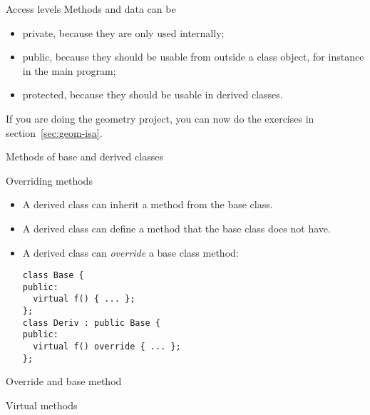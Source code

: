 \begin{block}{Access levels}
  \label{sl:private-etc}
  Methods and data can be
  \begin{itemize}
  \item private, because they are only used internally;
  \item public, because they should be usable from outside a class
    object, for instance in the main program;
  \item protected, because they should be usable in derived classes.
  \end{itemize}
\end{block}

\begin{exercise}
  If you are doing the geometry project, 
  you can now do the exercises in section~\ref{sec:geom-isa}.
\end{exercise}

 {Methods of base and derived classes}
\label{sec:derive-method}

\begin{block}{Overriding methods}
  \label{sl:obj-method-override}
  \begin{itemize}
  \item A derived class can inherit a method from the base class.
  \item A derived class can define a method that the base class does
    not have.
  \item A derived class can \emph{override} a
    base class method:
\begin{lstlisting}
class Base {
public:
  virtual f() { ... };
};
class Deriv : public Base {
public:
  virtual f() override { ... };
};
\end{lstlisting}
  \end{itemize}
\end{block}

\begin{block}{Override and base method}
  \label{sl:virtualoverride}
\end{block}

 {Virtual methods}

